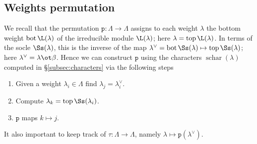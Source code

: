 \subsection{Weights permutation}
\label{subsec:weights_permutation}
We recall that the permutation $\mathtt{p}\colon\Lambda\to\Lambda$ assigns to each weight $\lambda$ the bottom weight $\operatorname{bot}\L(\lambda)$ of the irreducible module $\L(\lambda)$; here $\lambda=\operatorname{top}\L(\lambda)$. In terms of the socle $\Ss(\lambda)$, this is the inverse of the map $\lambda^\vee=\operatorname{bot}\Ss(\lambda)\mapsto\operatorname{top}\Ss(\lambda)$; here $\lambda^\vee=\lambda\ot\beta$. Hence we can construct $\mathtt{p}$ using the characters $\operatorname{schar}(\lambda)$ computed in \S\ref{subsec:characters} via the following steps
\begin{enumerate}
  \renewcommand{\labelenumi}{(\arabic{enumi})}
  \item Given a weight $\lambda_i\in\Lambda$ find $\lambda_j=\lambda_i^\vee$.
  \item Compute $\lambda_k=\operatorname{top}\Ss(\lambda_i)$.
  \item $\mathtt{p}$ maps $k\mapsto j$.
\end{enumerate}
It also important to keep track of $\tau\colon\Lambda\to\Lambda$, namely $\lambda\mapsto\mathtt{p}(\lambda^\vee)$.

